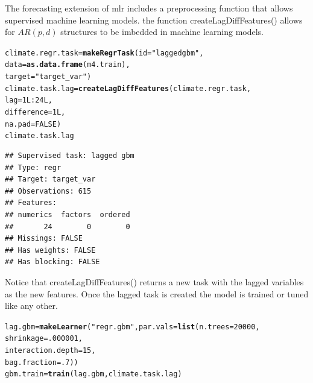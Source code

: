 \documentclass[12pt]{article}\usepackage[]{graphicx}\usepackage[]{color}
\makeatletter
\newcommand{\hlnum}[1]{\textcolor[rgb]{0.686,0.059,0.569}{#1}}%
\newcommand{\hlstr}[1]{\textcolor[rgb]{0.192,0.494,0.8}{#1}}%
\newcommand{\hlopt}[1]{\textcolor[rgb]{0,0,0}{#1}}%
\newcommand{\hlstd}[1]{\textcolor[rgb]{0.345,0.345,0.345}{#1}}%
\newcommand{\hlkwb}[1]{\textcolor[rgb]{0.69,0.353,0.396}{#1}}%
\newcommand{\hlkwc}[1]{\textcolor[rgb]{0.333,0.667,0.333}{#1}}%
\newcommand{\hlkwd}[1]{\textcolor[rgb]{0.737,0.353,0.396}{\textbf{#1}}}%
\newenvironment{kframe}{%
 \def\at@end@of@kframe{}%
 \ifinner\ifhmode%
  \def\at@end@of@kframe{\end{minipage}}%
  \begin{minipage}{\columnwidth}%
 \fi\fi%
 \def\FrameCommand##1{\hskip\@totalleftmargin \hskip-\fboxsep
 \colorbox{shadecolor}{##1}\hskip-\fboxsep
     \hskip-\linewidth \hskip-\@totalleftmargin \hskip\columnwidth}%
 \MakeFramed {\advance\hsize-\width
   \@totalleftmargin\z@ \linewidth\hsize
   \@setminipage}}%
 {\par\unskip\endMakeFramed%
 \at@end@of@kframe}
\newenvironment{knitrout}{}{} %
\theoremstyle{definition}
\newcommand\code{\@codex}
\def\@codex#1{{\normalfont\ttfamily\hyphenchar\font=-1 #1}}
\newcommand{\pkg}[1]{{\fontseries{b}\selectfont #1}}
\makeatother
\begin{document}
The forecasting extension of \pkg{mlr} includes a preprocessing function that allows supervised machine learning models. the function \code{createLagDiffFeatures()} allows for $AR(p,d)$ structures to be imbedded in machine learning models.
\singlespacing
\begin{knitrout}
\color{fgcolor}\begin{kframe}
\begin{alltt}
\hlstd{climate.regr.task} \hlkwb{=} \hlkwd{makeRegrTask}\hlstd{(}\hlkwc{id} \hlstd{=} \hlstr{"lagged gbm"}\hlstd{,}
                                 \hlkwc{data} \hlstd{=} \hlkwd{as.data.frame}\hlstd{(m4.train),}
                                 \hlkwc{target} \hlstd{=} \hlstr{"target_var"}\hlstd{)}
\hlstd{climate.task.lag} \hlkwb{=} \hlkwd{createLagDiffFeatures}\hlstd{(climate.regr.task,}
                                         \hlkwc{lag} \hlstd{=} \hlnum{1L}\hlopt{:}\hlnum{24L}\hlstd{,}
                                         \hlkwc{difference} \hlstd{=} \hlnum{1L}\hlstd{,}
                                         \hlkwc{na.pad}\hlstd{=}\hlnum{FALSE}\hlstd{)}
\hlstd{climate.task.lag}
\end{alltt}
\begin{verbatim}
## Supervised task: lagged gbm
## Type: regr
## Target: target_var
## Observations: 615
## Features:
## numerics  factors  ordered 
##       24        0        0 
## Missings: FALSE
## Has weights: FALSE
## Has blocking: FALSE
\end{verbatim}
\end{kframe}
\end{knitrout}
\doublespacing

Notice that \code{createLagDiffFeatures()} returns a new task with the lagged variables as the new features. Once the lagged task is created the model is trained or tuned like any other.

\singlespacing
\begin{knitrout}
\color{fgcolor}\begin{kframe}
\begin{alltt}
\hlstd{lag.gbm} \hlkwb{=} \hlkwd{makeLearner}\hlstd{(}\hlstr{"regr.gbm"}\hlstd{,} \hlkwc{par.vals} \hlstd{=} \hlkwd{list}\hlstd{(}\hlkwc{n.trees} \hlstd{=} \hlnum{20000}\hlstd{,}
                                                  \hlkwc{shrinkage} \hlstd{=} \hlnum{.000001}\hlstd{,}
                                                  \hlkwc{interaction.depth} \hlstd{=} \hlnum{15}\hlstd{,}
                                                  \hlkwc{bag.fraction} \hlstd{=} \hlnum{.7}\hlstd{))}
\hlstd{gbm.train} \hlkwb{=} \hlkwd{train}\hlstd{(lag.gbm, climate.task.lag)}
\end{alltt}
\end{kframe}
\end{knitrout}
\doublespacing
\end{document}
